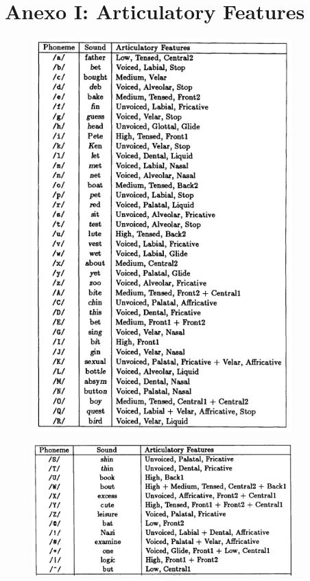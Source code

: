 \documentclass[paper=a4, fontsize=11pt]{scrartcl} %
\numberwithin{equation}{section} %
\numberwithin{figure}{section} %
\numberwithin{table}{section} %
\begin{document}
\newpage

\section { Anexo I: Articulatory Features}


\begin{center}
\begin{figure}[h!]
\centering
\includegraphics[width=100mm]{art_features.jpg}
\end{figure}
\end{center}

\begin{center}
\begin{figure}[h!]
\centering

\includegraphics[width=100mm]{art_features2.jpg}
\end{figure}
\end{center}
\end{document}
